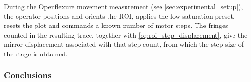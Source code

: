 During the Openflexure movement measurement (see \cref{sec:experimental_setup}), the operator positions and orients the $\text{ROI}$, applies the low-saturation preset, resets the plot and commands a known number of motor steps. The fringes counted in the resulting trace, together with \cref{eq:roi_step_displacement}, give the mirror displacement associated with that step count, from which the step size of the stage is obtained.

\subsubsection{Conclusions}